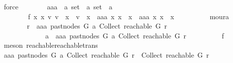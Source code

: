 \begin{isabellebody}
\ force\isanewline
\ \ \ \ \ \ \isamarkupfalse%
\ aaa\ {\isacharcolon}{\kern0pt}{\isacharcolon}{\kern0pt}\ {\isachardoublequoteopen}{\isacharprime}{\kern0pt}a\ set\ {\isasymRightarrow}\ {\isacharprime}{\kern0pt}a\ set\ {\isasymRightarrow}\ {\isacharprime}{\kern0pt}a{\isachardoublequoteclose}\ \isanewline
\ \ \ \ \ \ \ \ f{}{\isacharcolon}{\kern0pt}\ {\isachardoublequoteopen}{\isasymforall}x{}\ x{}{\isachardot}{\kern0pt}\ {\isacharparenleft}{\kern0pt}{\isasymexists}v{}{\isachardot}{\kern0pt}\ v{}\ {\isasymin}\ x{}\ {\isasymand}\ v{}\ {\isasymnotin}\ x{}{\isacharparenright}{\kern0pt}\ {\isacharequal}{\kern0pt}\ {\isacharparenleft}{\kern0pt}aaa\ x{}\ x{}\ {\isasymin}\ x{}\ {\isasymand}\ aaa\ x{}\ x{}\ {\isasymnotin}\ x{}{\isacharparenright}{\kern0pt}{\isachardoublequoteclose}\isanewline
\ \ \ \ \ \ \ \ \isamarkupfalse%
\ moura\isanewline
\ \ \ \ \ \ \isamarkupfalse%
\ {\isachardoublequoteopen}r\ {\isasymrightarrow}\isactrlsup {\isacharasterisk}{\kern0pt}\ aaa\ {\isacharparenleft}{\kern0pt}past{\isacharunderscore}{\kern0pt}nodes\ G\ a{\isacharparenright}{\kern0pt}\ {\isacharparenleft}{\kern0pt}Collect\ {\isacharparenleft}{\kern0pt}reachable\ G\ r{\isacharparenright}{\kern0pt}{\isacharparenright}{\kern0pt}\isanewline
\ \ \ \ \ \ \ \ \ \ \ \ {\isasymlongrightarrow}\ a\ {\isasymrightarrow}\isactrlsup {\isacharplus}{\kern0pt}\ aaa\ {\isacharparenleft}{\kern0pt}past{\isacharunderscore}{\kern0pt}nodes\ G\ a{\isacharparenright}{\kern0pt}\ {\isacharparenleft}{\kern0pt}Collect\ {\isacharparenleft}{\kern0pt}reachable\ G\ r{\isacharparenright}{\kern0pt}{\isacharparenright}{\kern0pt}{\isachardoublequoteclose}\isanewline
\ \ \ \ \ \ \ \ \isamarkupfalse%
\ f{}\ \isamarkupfalse%
\ {\isacharparenleft}{\kern0pt}meson\ reachable{}{\isacharunderscore}{\kern0pt}reachable{\isacharunderscore}{\kern0pt}trans{\isacharparenright}{\kern0pt}\isanewline
\ \ \ \ \ \ \isamarkupfalse%
\ \isamarkupfalse%
\ {\isachardoublequoteopen}aaa\ {\isacharparenleft}{\kern0pt}past{\isacharunderscore}{\kern0pt}nodes\ G\ a{\isacharparenright}{\kern0pt}\ {\isacharparenleft}{\kern0pt}Collect\ {\isacharparenleft}{\kern0pt}reachable\ G\ r{\isacharparenright}{\kern0pt}{\isacharparenright}{\kern0pt}\ {\isasymnotin}\ Collect\ {\isacharparenleft}{\kern0pt}reachable\ G\ r{\isacharparenright}{\kern0pt}\isanewline

\end{isabellebody}
